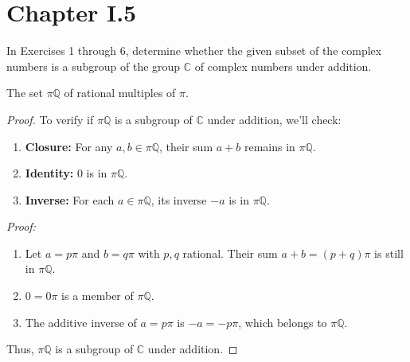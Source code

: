 \documentclass[12pt]{amsart}
\theoremstyle{definition}
\numberwithin{equation}{section}
\theoremstyle{plain}
\renewcommand{\C}{\mathbb{C}}
\newcommand{\Q}{\mathbb{Q}}
\begin{document}
    \section*{Chapter I.5}
    \begin{exercise}{5}
            In Exercises 1 through 6, determine whether the given subset of the complex numbers is a subgroup of the group $\C$ of complex numbers under addition.

            The set $\pi \Q$ of rational multiples of $\pi$.
    \begin{proof}
        To verify if \( \pi \Q \) is a subgroup of \( \C \) under addition, we'll check:
        
        \begin{enumerate}
            \item \textbf{Closure:} For any \( a, b \in \pi \Q \), their sum \( a + b \) remains in \( \pi \Q \).
            \item \textbf{Identity:} \( 0 \) is in \( \pi \Q \).
            \item \textbf{Inverse:} For each \( a \in \pi \Q \), its inverse \( -a \) is in \( \pi \Q \).
        \end{enumerate}
        \textit{Proof:}
 \begin{enumerate}
    \item Let \( a = p\pi \) and \( b = q\pi \) with \( p, q \) rational. Their sum \( a + b = (p + q)\pi \) is still in \( \pi \Q \).
    \item \( 0 = 0\pi \) is a member of \( \pi \Q \).
    \item The additive inverse of \( a = p\pi \) is \( -a = -p\pi \), which belongs to \( \pi \Q \).
 \end{enumerate}
        
        Thus, \( \pi \Q \) is a subgroup of \( \C \) under addition.
    \end{proof}
    \end{exercise}
\end{document}
